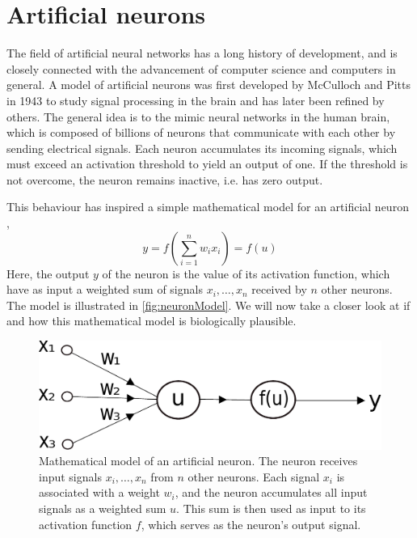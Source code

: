 \documentclass[twoside,english]{uiofysmaster}
\begin{document}
\section{Artificial neurons} \label{sec:ANN}
The field of artificial neural networks has a long history of development, and is closely connected with 
the advancement of computer science and computers in general. A model of artificial neurons 
was first developed by McCulloch and Pitts in 1943 \cite{McCulloch43} to study signal processing in the brain and 
has later been refined by others. The general idea is to the mimic neural networks in the human brain, which
is composed of billions of neurons that communicate with each other by sending electrical signals. 
Each neuron accumulates its incoming signals, 
which must exceed an activation threshold to yield an output of one. If the threshold is not overcome, the neuron
remains inactive, i.e. has zero output.  

This behaviour has inspired a simple mathematical model for an artificial neuron \cite{Rojas96},
\begin{equation}
 y = f\left(\sum_{i=1}^n w_ix_i\right) = f(u)
 \label{artificialNeuron}
\end{equation}
Here, the output $y$ of the neuron is the value of its activation function, which have as input
a weighted sum of signals $x_i, \dots ,x_n$ received by $n$ other neurons.
The model is illustrated in \autoref{fig:neuronModel}. We will now take a closer look at if and how 
this mathematical model is biologically plausible.
\begin{figure}
 \begin{center}
  \includegraphics[width=\linewidth]{Figures/Theory/neuron.pdf}
  \caption{Mathematical model of an artificial neuron. The neuron receives input signals $x_i,\dots,x_n$ from
	   $n$ other neurons. Each signal $x_i$ is associated with a weight $w_i$, and the neuron accumulates
	   all input signals as a weighted sum $u$. This sum is then used as input to its activation function
	   $f$, which serves as the neuron's output signal.}
  \label{fig:neuronModel}
 \end{center}
\end{figure}
\end{document}
